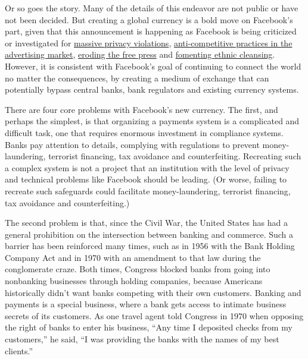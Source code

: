 Or so goes the story. Many of the details of this endeavor are not
public or have not been decided. But creating a global currency is a
bold move on Facebook's part, given that this announcement is happening
as Facebook is being criticized or investigated for
\href{https://www.ftc.gov/news-events/press-releases/2018/03/statement-acting-director-ftcs-bureau-consumer-protection}{massive
privacy violations},
\href{https://www.bundeskartellamt.de/SharedDocs/Meldung/EN/Pressemitteilungen/2019/07_02_2019_Facebook.html}{anti-competitive
practices in the advertising market},
\href{https://cicilline.house.gov/press-release/cicilline-opening-remarks-antitrust-subcommittee-hearing}{eroding
the free press} and
\href{https://www.reuters.com/article/us-myanmar-rohingya-facebook/u-n-investigators-cite-facebook-role-in-myanmar-crisis-idUSKCN1GO2PN}{fomenting
ethnic cleansing}. However, it is consistent with Facebook's goal of
continuing to connect the world no matter the consequences, by creating
a medium of exchange that can potentially bypass central banks, bank
regulators and existing currency systems.

There are four core problems with Facebook's new currency. The first,
and perhaps the simplest, is that organizing a payments system is a
complicated and difficult task, one that requires enormous investment in
compliance systems. Banks pay attention to details, complying with
regulations to prevent money-laundering, terrorist financing, tax
avoidance and counterfeiting. Recreating such a complex system is not a
project that an institution with the level of privacy and technical
problems like Facebook should be leading. (Or worse, failing to recreate
such safeguards could facilitate money-laundering, terrorist financing,
tax avoidance and counterfeiting.)

The second problem is that, since the Civil War, the United States has
had a general prohibition on the intersection between banking and
commerce. Such a barrier has been reinforced many times, such as in 1956
with the Bank Holding Company Act and in 1970 with an amendment to that
law during the conglomerate craze. Both times, Congress blocked banks
from going into nonbanking businesses through holding companies, because
Americans historically didn't want banks competing with their own
customers. Banking and payments is a special business, where a bank gets
access to intimate business secrets of its customers. As one travel
agent told Congress in 1970 when opposing the right of banks to enter
his business, ``Any time I deposited checks from my customers,'' he
said, ``I was providing the banks with the names of my best clients.''

